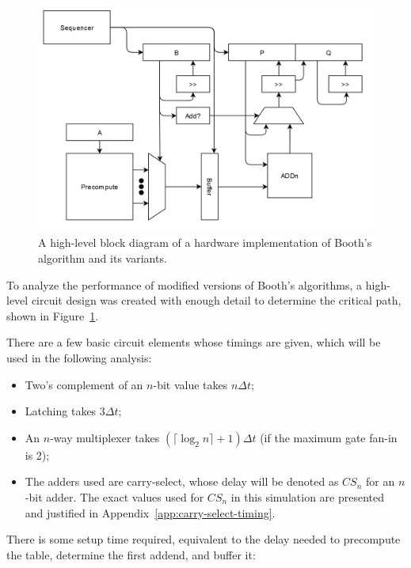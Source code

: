 \documentclass[12pt]{article}
\begin{document}
\begin{figure}
    \includegraphics[scale=0.5]{booth-circuit.png}
    \caption{
        A high-level block diagram of a hardware implementation of Booth's
        algorithm and its variants.
    }
    \label{fig:booth-circuit}
\end{figure}

To analyze the performance of modified versions of Booth's algorithms, a
high-level circuit design was created with enough detail to determine the
critical path, shown in Figure~\ref{fig:booth-circuit}.

There are a few basic circuit elements whose timings are given, which will be
used in the following analysis:

\begin{itemize}
    \item Two's complement of an $n$-bit value takes $n\Delta t$;
    \item Latching takes $3\Delta t$;
    \item An $n$-way multiplexer takes $(\lceil \log_2{n}\rceil + 1)\Delta t$
        (if the maximum gate fan-in is 2);
    \item The adders used are carry-select, whose delay will be denoted as
        $CS_n$ for an $n$-bit adder. The exact values used for $CS_n$ in this
        simulation are presented and justified in
        Appendix~\ref{app:carry-select-timing}.
\end{itemize}

There is some setup time required, equivalent to the delay needed to precompute
the table, determine the first addend, and buffer it:
\end{document}

